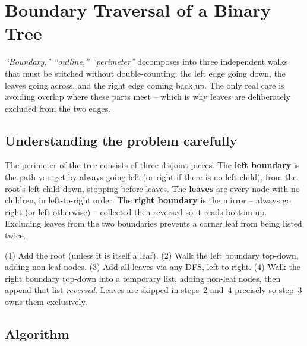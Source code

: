 \section{Boundary Traversal of a Binary Tree}
\label{sec:trees-boundary}


\begin{patternbox}
\emph{``Boundary,'' ``outline,'' ``perimeter''} decomposes into three
independent walks that must be stitched without double-counting: the left
edge going down, the leaves going across, and the right edge coming back
up. The only real care is avoiding overlap where these parts meet -- which
is why leaves are deliberately excluded from the two edges.
\end{patternbox}

\subsection*{Understanding the problem carefully}

The perimeter of the tree consists of three disjoint pieces. The
\textbf{left boundary} is the path you get by always going left (or right
if there is no left child), from the root's left child down, stopping
before leaves. The \textbf{leaves} are every node with no children, in
left-to-right order. The \textbf{right boundary} is the mirror -- always
go right (or left otherwise) -- collected then reversed so it reads
bottom-up. Excluding leaves from the two boundaries prevents a corner leaf
from being listed twice.

\begin{ideabox}
(1) Add the root (unless it is itself a leaf). (2) Walk the left boundary
top-down, adding non-leaf nodes. (3) Add all leaves via any DFS,
left-to-right. (4) Walk the right boundary top-down into a temporary list,
adding non-leaf nodes, then append that list \emph{reversed}. Leaves are
skipped in steps~2 and~4 precisely so step~3 owns them exclusively.
\end{ideabox}

\subsection*{Algorithm}

